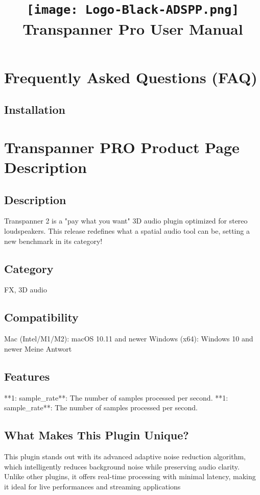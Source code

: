 \documentclass[8pt]{article}
\title{\vspace{-5em}%
\begin{center}%
\texttt{[image: Logo-Black-ADSPP.png]}\\[1em]%
\huge\textbf{Transpanner Pro User Manual}%
\end{center}%
\vspace{-1.5em}}
\date{}
\begin{document}
\section*{Frequently Asked Questions (FAQ)}

\subsection*{Installation}

    \section*{Transpanner PRO  Product Page Description}

    \subsection*{Description}
    Transpanner 2 is a "pay what you want" 3D audio plugin optimized for stereo loudspeakers. This release redefines what a spatial audio tool can be, setting a new benchmark in its category!

    \subsection*{Category}
    FX, 3D audio

    \subsection*{Compatibility}
    Mac (Intel/M1/M2): macOS 10.11 and newer
Windows (x64): Windows 10 and newer
Meine Antwort


    \subsection*{Features}
    **1: sample_rate**: The number of samples processed per second.
**1: sample_rate**: The number of samples processed per second.

    \subsection*{What Makes This Plugin Unique?}
    This plugin stands out with its advanced adaptive noise reduction algorithm, which intelligently reduces background noise while preserving audio clarity. Unlike other plugins, it offers real-time processing with minimal latency, making it ideal for live performances and streaming applications
\end{document}

